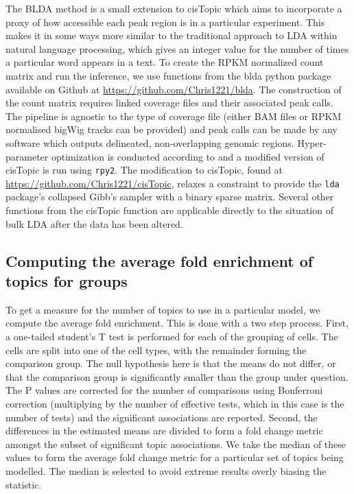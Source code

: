 The BLDA method is a small extension to cisTopic which aims to incorporate a proxy of how accessible each peak region is in a particular experiment. This makes it in some ways more similar to the traditional approach to LDA within natural language processing, which gives an integer value for the number of times a particular word appears in a text. To create the RPKM normalized count matrix and run the inference, we use functions from the blda python package available on Github at \url{https://github.com/Chris1221/blda}.  The construction of the count matrix requires linked coverage files and their associated peak calls. The pipeline is agnostic to the type of coverage file (either BAM files or RPKM normalised bigWig tracks can be provided) and peak calls can be made by any software which outputs delineated, non-overlapping genomic regions. Hyper-parameter optimization is conducted according to  and a modified version of cisTopic is run using {\tt rpy2}. The modification to cisTopic, found at \url{https://github.com/Chris1221/cisTopic}, relaxes a constraint to provide the {\tt lda} package's collapsed Gibb's sampler with a binary sparse matrix. Several other functions from the cisTopic function are applicable directly to the situation of bulk LDA after the data has been altered. 

\subsection{Computing the average fold enrichment of topics for groups} \label{methods:average_fc}

To get a measure for the number of topics to use in a particular model, we compute the average fold enrichment. This is done with a two step process. First, a one-tailed student's T test is performed for each of the grouping of cells. The cells are split into one of the cell types, with the remainder forming the comparison group. The null hypothesis here is that the means do not differ, or that the comparison group is significantly smaller than the group under question. The P values are corrected for the number of comparisons using Bonferroni correction (multiplying by the number of effective tests, which in this case is the number of tests) and the significant associations are reported. Second, the differences in the estimated means are divided to form a fold change metric amongst the subset of significant topic associations. We take the median of these values to form the average fold change metric for a particular set of topics being modelled. The median is selected to avoid extreme results overly biasing the statistic.


